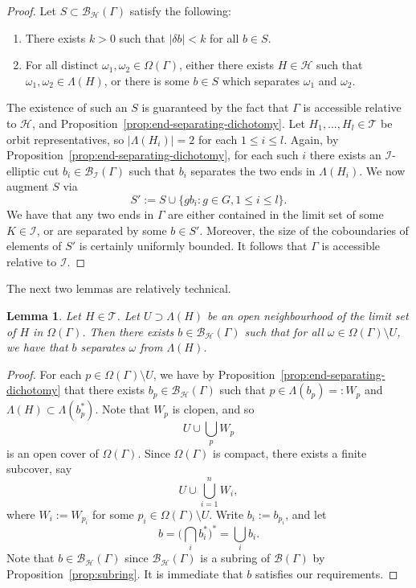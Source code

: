 \documentclass[11pt,a4paper]{amsart}
\newtheorem{lemma}[theorem]{Lemma}
\theoremstyle{definition}
\newcommand{\per}{\mathcal{H}}
\newcommand{\br}{{\mathscr{B}}}
\begin{document}
    \begin{proof}
        Let $S \subset \br_\per(\Gamma)$ satisfy the following:
        \begin{enumerate}
            \item There exists $k > 0$ such that $|\delta b| < k$ for all $b \in S$.

            \item For all distinct $\omega_1, \omega_2 \in \Omega(\Gamma)$, either there exists $H \in \per$ such that $\omega_1, \omega_2 \in \Lambda(H)$, or there is some $b \in S$ which separates $\omega_1$ and $\omega_2$. 
        \end{enumerate}
        The existence of such an $S$ is guaranteed by the fact that $\Gamma$ is accessible relative to $\per$, and Proposition~\ref{prop:end-separating-dichotomy}. Let $H_1, \ldots, H_l \in \mathcal T$ be orbit representatives, so $|\Lambda(H_i)|=2$ for each $1 \leq i \leq l$. Again, by Proposition~\ref{prop:end-separating-dichotomy}, for each such $i$ there exists an $\mathcal I$-elliptic cut $b_i \in \br_{\mathcal I}(\Gamma)$ such that $b_i$ separates the two ends in $\Lambda(H_i)$. 
        We now augment $S$ via
        $$
        S' := S \cup \{g b_i : g \in G, 1 \leq i \leq l\}. 
        $$
        We have that any two ends in $\Gamma$ are either contained in the limit set of some $K \in \mathcal I$, or are separated by some $b \in S'$. Moreover, the size of the coboundaries of elements of $S'$ is certainly uniformly bounded. It follows that $\Gamma$ is accessible relative to $\mathcal I$. 
    \end{proof}

    
The next two lemmas are relatively technical.

    \begin{lemma}\label{claim:finding-the-special-cut}
        Let $H \in \mathcal T$. Let $U \supset \Lambda(H)$ be an open neighbourhood of the limit set of $H$ in $\Omega(\Gamma)$. Then there exists $b \in \br_\per(\Gamma)$ such that for all $\omega \in \Omega(\Gamma) \setminus U$, we have that $b$ separates $\omega$ from $\Lambda(H)$. 
    \end{lemma}

    \begin{proof}
        For each $p \in \Omega(\Gamma)\setminus U$, we have by Proposition~\ref{prop:end-separating-dichotomy} that there exists $b_p \in \br_\per(\Gamma)$ such that $p \in \Lambda(b_p) =: W_p$ and $\Lambda(H) \subset \Lambda(b^\ast_p)$. Note that $W_p$ is clopen, and so
        $$
        U \cup \bigcup_p W_p
        $$
        is an open cover of $\Omega(\Gamma)$. Since $\Omega(\Gamma)$ is compact, there exists a finite subcover, say
        $$
        U \cup \bigcup_{i=1}^n W_i,
        $$
        where $W_i := W_{p_i}$ for some $p_i \in \Omega(\Gamma) \setminus U$. Write $b_i := b_{p_i}$, and let
        $$
        b = \bigg(\bigcap_i b_i^\ast\bigg)^\ast = \bigcup_i b_i.
        $$
        Note that $b \in \br_\per(\Gamma)$  since $\br_\per(\Gamma)$ is a subring of $\br(\Gamma)$ by Proposition~\ref{prop:subring}. It is immediate that $b$ satisfies our requirements. 
    \end{proof}
\end{document}
